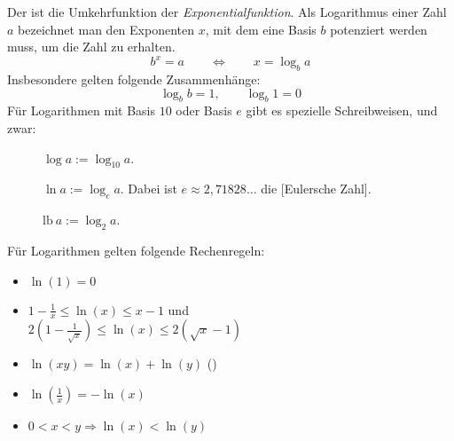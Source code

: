 Der  ist die Umkehrfunktion der \textit{Exponentialfunktion}. Als Logarithmus einer Zahl $a$ bezeichnet man den Exponenten $x$, mit dem eine Basis $b$ potenziert werden muss, um die Zahl zu erhalten.
$$b^x = a \qquad \Longleftrightarrow \qquad x = \log_b a$$
Insbesondere gelten folgende Zusammenhänge:
$$\log_b b = 1, \qquad \log_b 1 = 0$$
Für Logarithmen mit Basis $10$ oder Basis $e$ gibt es spezielle Schreibweisen, und zwar:
\begin{description}
    \item[] $\log a := \log_{10} a$.
    \item[] $\ln a := \log_e a$. Dabei ist $e \approx 2,71828\dots$ die [Eulersche Zahl].
    \item[] $\text{lb} \ a := \log_2 a$.
\end{description}
Für Logarithmen gelten folgende Rechenregeln:
\begin{itemize}
    \item $\ln(1) = 0$
    \item $1-\frac{1}{x} \leq \ln(x) \leq x-1$ und \\
    $2(1-\frac{1}{\sqrt{x}}) \leq \ln(x) \leq 2 (\sqrt{x} - 1)$
    \item $\ln(xy) = \ln(x) + \ln(y)$ ()
    \item $\ln(\frac{1}{x}) = -\ln(x)$
    \item $0<x<y \Longrightarrow \ln(x) < \ln(y)$
\end{itemize}